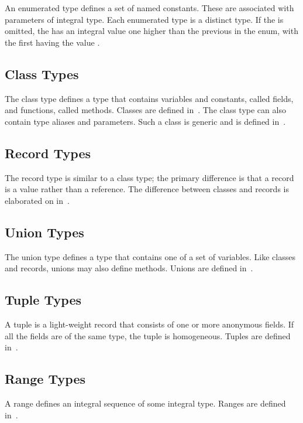 An enumerated type defines a set of named constants.  These are
associated with parameters of integral type.  Each enumerated type is
a distinct type. If the  is omitted, the
 has an integral value one higher than the previous
 in the enum, with the first having the value .

\subsection{Class Types}
\label{Class_Types}

The class type defines a type that contains variables and constants,
called fields, and functions, called methods.  Classes are defined
in~.  The class type can also contain type aliases and
parameters.  Such a class is generic and is defined
in~.

\subsection{Record Types}
\label{Record_Types}

The record type is similar to a class type; the primary difference is
that a record is a value rather than a reference.  The difference
between classes and records is elaborated on in~.

\subsection{Union Types}
\label{Union_Types}

The union type defines a type that contains one of a set of variables.
Like classes and records, unions may also define methods.  Unions are
defined in~.

\subsection{Tuple Types}
\label{Tuple_Types}

A tuple is a light-weight record that consists of one or more
anonymous fields.  If all the fields are of the same type, the tuple
is homogeneous.  Tuples are defined in~.

\subsection{Range Types}

A range defines an integral sequence of some integral type.  Ranges
are defined in~.

